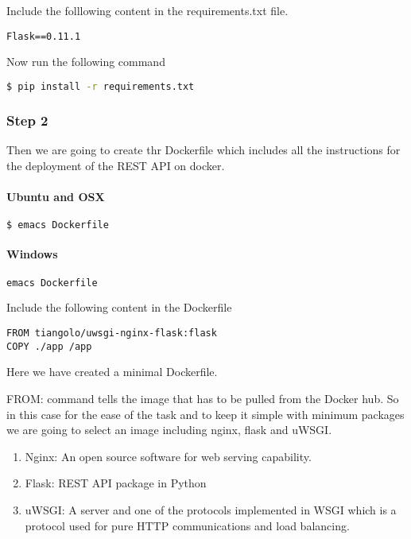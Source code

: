 Include the folllowing content in the requirements.txt file.

\begin{lstlisting}
Flask==0.11.1
\end{lstlisting}

Now run the following command

\begin{lstlisting}[language=bash]
$ pip install -r requirements.txt
\end{lstlisting}

\subsubsection{Step 2}

Then we are going to create thr Dockerfile which includes all the
instructions for the deployment of the REST API on docker.

\paragraph{Ubuntu and OSX}

\begin{lstlisting}[language=bash]
$ emacs Dockerfile
\end{lstlisting}

\paragraph{Windows}

\begin{lstlisting}[language=bash]
emacs Dockerfile
\end{lstlisting}

Include the following content in the Dockerfile

\begin{lstlisting}
FROM tiangolo/uwsgi-nginx-flask:flask
COPY ./app /app
\end{lstlisting}

Here we have created a minimal Dockerfile.

FROM: command tells the image that has to be pulled from the Docker hub.
So in this case for the ease of the task and to keep it simple with
minimum packages we are going to select an image including nginx, flask
and uWSGI.

\begin{enumerate}
\item
  Nginx: An open source software for web serving capability.
\item
  Flask: REST API package in Python
\item
  uWSGI: A server and one of the protocols implemented in WSGI which is
  a protocol used for pure HTTP communications and load balancing.
\end{enumerate}

